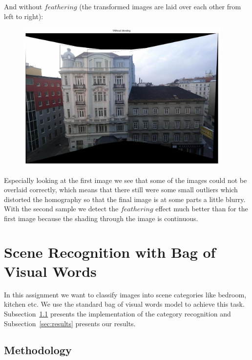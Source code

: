 \documentclass[subfigure,epsfig,fleqn,float,numbers=noenddot]{scrartcl}
\begin{document}
And without $feathering$ (the transformed images are laid over each other from left to right):
\begin{figure}[H]
		\centering
		\includegraphics[width=0.95\textwidth]{./img/withoutBlending2.jpg}
		\caption{}
		\label{img:withoutBlend2}
\end{figure}

Especially looking at the first image we see that some of the images could not be overlaid correctly, which means that there still were some small outliers which distorted the homography so that the final image is at some parts a little blurry. 
With the second sample we detect the $feathering$ effect much better than for the first image because the shading through the image is continuous. 


\section{Scene Recognition with Bag of Visual Words}
\label{sec:2}

In this assignment we want to classify images into scene categories like bedroom, kitchen etc. 
We use the standard bag of visual words model to achieve this task. Subsection~\ref{sec:methodology} presents the implementation of the category recognition and Subsection~\ref{sec:results} presents our results.

\subsection{Methodology}
\label{sec:methodology}
\end{document}
